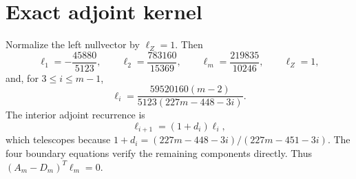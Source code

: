 \section*{Exact adjoint kernel}
Normalize the left nullvector by $\ell_Z=1$.  Then
\[
\ell_1=-\frac{45880}{5123},
\qquad
\ell_2=\frac{783160}{15369},
\qquad
\ell_m=\frac{219835}{10246},
\qquad
\ell_Z=1,
\]
and, for $3\le i\le m-1$,
\[
\ell_i=\frac{59520160(m-2)}{5123(227m-448-3i)}.
\]
The interior adjoint recurrence is
\[
\ell_{i+1}=(1+d_i)\ell_i,
\]
which telescopes because
$1+d_i=(227m-448-3i)/(227m-451-3i)$.  The four boundary equations verify the
remaining components directly.  Thus $(A_m-D_m)^T\ell_m=0$.

